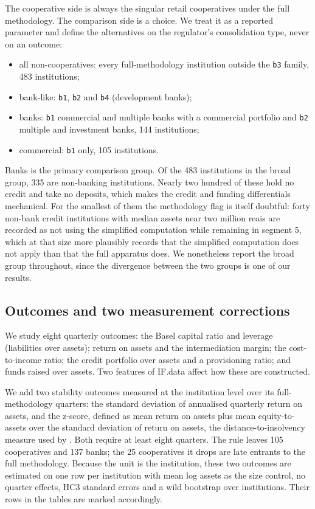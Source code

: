 \documentclass[11pt,a4paper]{article}
\begin{document}
The cooperative side is always the singular retail cooperatives under the full
methodology. The comparison side is a choice. We treat it as a reported parameter and
define the alternatives on the regulator's consolidation type, never on an outcome:

\begin{itemize}
\item all non-cooperatives: every full-methodology institution outside the \texttt{b3}
family, 483 institutions;
\item bank-like: \texttt{b1}, \texttt{b2} and \texttt{b4} (development banks);
\item banks: \texttt{b1} commercial and multiple banks with a commercial portfolio and
\texttt{b2} multiple and investment banks, 144 institutions;
\item commercial: \texttt{b1} only, 105 institutions.
\end{itemize}

Banks is the primary comparison group. Of the 483 institutions in the broad group, 335
are non-banking institutions. Nearly two hundred of these hold no credit and take no
deposits, which makes the credit and funding differentials mechanical. For the smallest
of them the methodology flag is itself doubtful: forty non-bank credit institutions with
median assets near two million reais are recorded as not using the simplified computation
while remaining in segment 5, which at that size more plausibly records that the
simplified computation does not apply than that the full apparatus does. We nonetheless
report the broad group throughout, since the divergence between the two groups is one of
our results.

\subsection{Outcomes and two measurement corrections}
\label{sec:measurement}

We study eight quarterly outcomes: the Basel capital ratio and leverage (liabilities over
assets); return on assets and the intermediation margin; the cost-to-income ratio; the
credit portfolio over assets and a provisioning ratio; and funds raised over assets. Two
features of IF.data affect how these are constructed.

We add two stability outcomes measured at the institution level over its
full-methodology quarters: the standard deviation of annualised quarterly return on
assets, and the z-score, defined as mean return on assets plus mean equity-to-assets over
the standard deviation of return on assets, the distance-to-insolvency measure used by
\citet{hesse2007}. Both require at least eight quarters. The rule leaves 105 cooperatives
and 137 banks; the 25 cooperatives it drops are late entrants to the full methodology.
Because the unit is the institution, these two outcomes are estimated on one row per
institution with mean log assets as the size control, no quarter effects, HC3 standard
errors and a wild bootstrap over institutions. Their rows in the tables are marked
accordingly.
\end{document}
